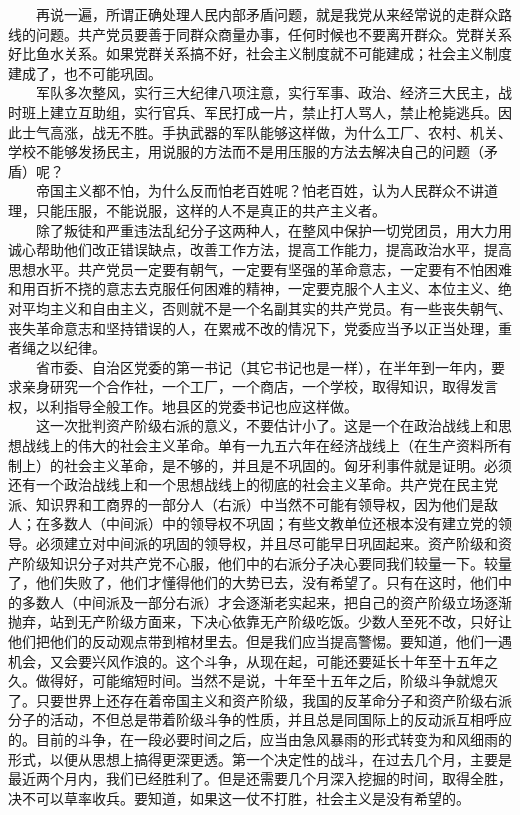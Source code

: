 \documentclass[cn,11pt,chinese]{elegantbook}
\begin{document}
　　再说一遍，所谓正确处理人民内部矛盾问题，就是我党从来经常说的走群众路线的问题。共产党员要善于同群众商量办事，任何时候也不要离开群众。党群关系好比鱼水关系。如果党群关系搞不好，社会主义制度就不可能建成；社会主义制度建成了，也不可能巩固。\\
　　军队多次整风，实行三大纪律八项注意，实行军事、政治、经济三大民主，战时班上建立互助组，实行官兵、军民打成一片，禁止打人骂人，禁止枪毙逃兵。因此士气高涨，战无不胜。手执武器的军队能够这样做，为什么工厂、农村、机关、学校不能够发扬民主，用说服的方法而不是用压服的方法去解决自己的问题（矛盾）呢？\\
　　帝国主义都不怕，为什么反而怕老百姓呢？怕老百姓，认为人民群众不讲道理，只能压服，不能说服，这样的人不是真正的共产主义者。\\
　　除了叛徒和严重违法乱纪分子这两种人，在整风中保护一切党团员，用大力用诚心帮助他们改正错误缺点，改善工作方法，提高工作能力，提高政治水平，提高思想水平。共产党员一定要有朝气，一定要有坚强的革命意志，一定要有不怕困难和用百折不挠的意志去克服任何困难的精神，一定要克服个人主义、本位主义、绝对平均主义和自由主义，否则就不是一个名副其实的共产党员。有一些丧失朝气、丧失革命意志和坚持错误的人，在累戒不改的情况下，党委应当予以正当处理，重者绳之以纪律。\\
　　省市委、自治区党委的第一书记（其它书记也是一样），在半年到一年内，要求亲身研究一个合作社，一个工厂，一个商店，一个学校，取得知识，取得发言权，以利指导全般工作。地县区的党委书记也应这样做。\\
　　这一次批判资产阶级右派的意义，不要估计小了。这是一个在政治战线上和思想战线上的伟大的社会主义革命。单有一九五六年在经济战线上（在生产资料所有制上）的社会主义革命，是不够的，并且是不巩固的。匈牙利事件就是证明。必须还有一个政治战线上和一个思想战线上的彻底的社会主义革命。共产党在民主党派、知识界和工商界的一部分人（右派）中当然不可能有领导权，因为他们是敌人；在多数人（中间派）中的领导权不巩固；有些文教单位还根本没有建立党的领导。必须建立对中间派的巩固的领导权，并且尽可能早日巩固起来。资产阶级和资产阶级知识分子对共产党不心服，他们中的右派分子决心要同我们较量一下。较量了，他们失败了，他们才懂得他们的大势已去，没有希望了。只有在这时，他们中的多数人（中间派及一部分右派）才会逐渐老实起来，把自己的资产阶级立场逐渐抛弃，站到无产阶级方面来，下决心依靠无产阶级吃饭。少数人至死不改，只好让他们把他们的反动观点带到棺材里去。但是我们应当提高警惕。要知道，他们一遇机会，又会要兴风作浪的。这个斗争，从现在起，可能还要延长十年至十五年之久。做得好，可能缩短时间。当然不是说，十年至十五年之后，阶级斗争就熄灭了。只要世界上还存在着帝国主义和资产阶级，我国的反革命分子和资产阶级右派分子的活动，不但总是带着阶级斗争的性质，并且总是同国际上的反动派互相呼应的。目前的斗争，在一段必要时间之后，应当由急风暴雨的形式转变为和风细雨的形式，以便从思想上搞得更深更透。第一个决定性的战斗，在过去几个月，主要是最近两个月内，我们已经胜利了。但是还需要几个月深入挖掘的时间，取得全胜，决不可以草率收兵。要知道，如果这一仗不打胜，社会主义是没有希望的。\\
\end{document}
